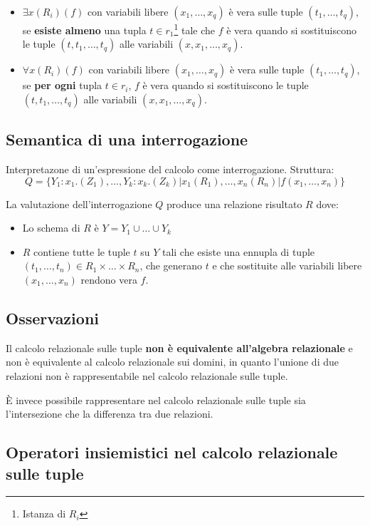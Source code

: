 \documentclass{report}
\begin{document}
\begin{itemize}
\item $\exists x(R_i)(f)$ con variabili libere $(x_1, \dots, x_q)$ \`e vera sulle tuple $(t_1, \dots, t_q)$, se \textbf{esiste almeno} una tupla $t\in r_1$\footnote{Istanza di $R_i$} tale che $f$ \`e vera quando si sostituiscono le tuple $(t, t_1, \dots, t_q)$ alle variabili $(x, x_1, \dots, x_q)$.
\item $\forall x(R_i)(f)$ con variabili libere $(x_1, \dots, x_q)$ \`e vera sulle tuple $(t_1, \dots, t_q)$, se \textbf{per ogni} tupla $t\in r_i$, $f$ \`e vera quando si sostituiscono le tuple $(t, t_1, \dots, t_q)$ alle variabili $(x, x_1, \dots, x_q)$.
\end{itemize}


\subsection{Semantica di una interrogazione}

Interpretazone di un'espressione del calcolo come interrogazione. Struttura:
\[ Q= \{Y_1:x_1 . (Z_1),\dots,Y_k:x_k . (Z_k) | x_1(R_1), \dots, x_n(R_n) | f(x_1, \dots, x_n) \} \]

La valutazione dell'interrogazione $Q$ produce una relazione risultato $R$ dove:
\begin{itemize}
\item Lo schema di $R$ \`e $Y = Y_1 \cup \dots \cup Y_k$
\item $R$ contiene tutte le tuple $t$ su $Y$ tali che esiste una ennupla di tuple $(t_1, \dots, t_n) \in R_1 \times \dots \times R_n$, che generano $t$ e che sostituite alle variabili libere $(x_1, \dots, x_n)$ rendono vera $f$.
\end{itemize}

\subsection{Osservazioni}
Il calcolo relazionale sulle tuple \textbf{non \`e equivalente all'algebra relazionale} e non \`e equivalente al calcolo relazionale sui domini, in quanto l'unione di due relazioni non \`e rappresentabile nel calcolo relazionale sulle tuple.

\`E invece possibile rappresentare nel calcolo relazionale sulle tuple sia l'intersezione che la differenza tra due relazioni.

\subsection{Operatori insiemistici nel calcolo relazionale sulle tuple}
\end{document}
